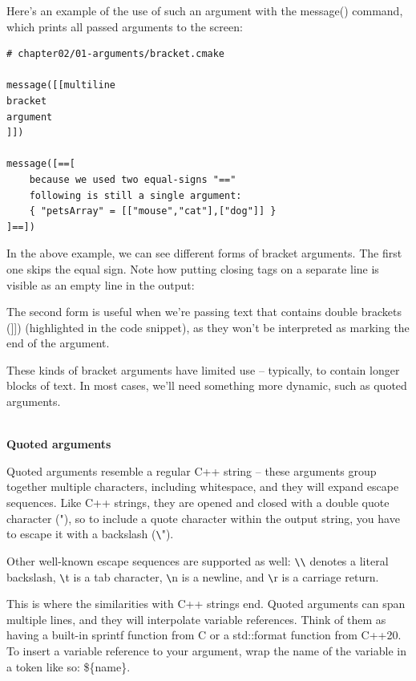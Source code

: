 Here's an example of the use of such an argument with the message() command, which prints all passed arguments to the screen:

\begin{lstlisting}[style=styleCMake]
# chapter02/01-arguments/bracket.cmake	

message([[multiline
bracket
argument
]])

message([==[
	because we used two equal-signs "=="
	following is still a single argument:
	{ "petsArray" = [["mouse","cat"],["dog"]] }
]==])
\end{lstlisting}

In the above example, we can see different forms of bracket arguments. The first one skips the equal sign. Note how putting closing tags on a separate line is visible as an empty line in the output:


The second form is useful when we're passing text that contains double brackets (]]) (highlighted in the code snippet), as they won't be interpreted as marking the end of the argument.

These kinds of bracket arguments have limited use – typically, to contain longer blocks of text. In most cases, we'll need something more dynamic, such as quoted arguments.

\hspace*{\fill} \\ %
\noindent
\textbf{Quoted arguments}

Quoted arguments resemble a regular C++ string – these arguments group together multiple characters, including whitespace, and they will expand escape sequences. Like C++ strings, they are opened and closed with a double quote character ("), so to include a quote character within the output string, you have to escape it with a backslash (\verb|\|").

Other well-known escape sequences are supported as well: \verb|\|\verb|\| denotes a literal backslash, \verb|\|t is a tab character, \verb|\|n is a newline, and \verb|\|r is a carriage return.

This is where the similarities with C++ strings end. Quoted arguments can span multiple lines, and they will interpolate variable references. Think of them as having a built-in sprintf function from C or a std::format function from C++20. To insert a variable reference to your argument, wrap the name of the variable in a token like so: \$\{name\}.

